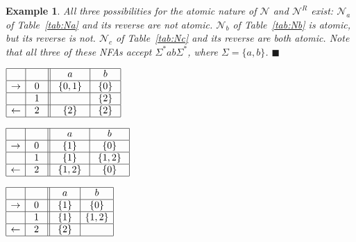 \documentclass[preprint,12pt]{elsarticle}
\newcommand{\Sig}{\Sigma}
\newcommand{\cN}{{\mathcal N}}
\newcommand{\rev}{R}
\newcommand{\qedb}{\hfill$\blacksquare$}
\newtheorem{example}{Example}
\begin{document}
\begin{example}
\label{ex:atomicity}
All three possibilities for the atomic nature of $\cN$ and $\cN^\rev$ exist:
$\cN_{a}$ of Table~\ref{tab:Na} and its reverse are not atomic.
$\cN_{b}$ of Table~\ref{tab:Nb} is atomic, but its reverse is not.
$\cN_{c}$ of Table~\ref{tab:Nc} and its reverse are both atomic.
Note that all three of these NFAs accept $\Sig^*ab\Sig^*$, where $\Sig=\{a,b\}$.
\qedb
\begin{table}[b]
\begin{minipage}[b]{0.3\linewidth}
\caption{$\cN_a$.}
\label{tab:Na}
{\footnotesize
\begin{center}
$
\begin{array}{|c| c||c| c| }    
\hline
& \ \  \ \ 
&\ \ a \ \ &\ \ b \ \   \\
\hline  
\rightarrow & 0
& \ \{0,1\} \ & \ \{0\} \   \\
\hline  
& 1
&  & \{2\}    \\
\hline  
\leftarrow& 2
&  \{2\} &  \{2\}   \\
\hline  
\end{array}
$
\end{center}}
\end{minipage}
\hspace{0.3cm}
\begin{minipage}[b]{0.3\linewidth}
\caption{$\cN_b$.}
\label{tab:Nb}
{\footnotesize
\begin{center}
$
\begin{array}{|c| c||c| c| }    
\hline
& \ \  \ \ 
&\ \ a \ \ &\ \ b \ \ \\
\hline  
\rightarrow & 0
& \ \{1\} \ & \ \{0\} \ \\
\hline  
 & 1
&  \{1 \} & \  \{1,2 \} \ \\
\hline  
\leftarrow & \ 2 \
 & \ \{1,2\} \ & \ \{ 0\} \ \\
\hline  
\end{array}
$
\end{center}}
\end{minipage}
\hspace{0.55cm}
\begin{minipage}[b]{0.3\linewidth}
\caption{$\cN_c$.}
\label{tab:Nc}
{\footnotesize
\begin{center}
$
\begin{array}{|c| c||c| c| }    
\hline
& \ \  \ \ 
&\ \ a \ \ &\ \ b \ \ \\
\hline  
\rightarrow & 0
& \ \{1\} \ & \ \{0\} \ \\
\hline  
 & 1
&  \{1\} & \{1,2\} \\
\hline  
\leftarrow & \ 2 \
 & \ \{2\} \ & \  \ \\
\hline  
\end{array}
$
\end{center}}
\end{minipage}

\end{table}

\end{example}
\end{document}
